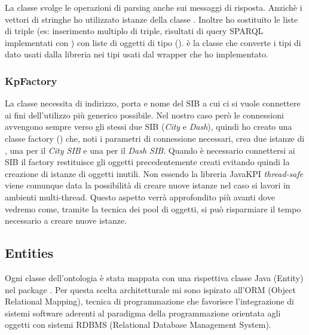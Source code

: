La classe  svolge le operazioni di parsing anche sui messaggi di risposta. Anzichè i vettori di stringhe ho utilizzato istanze della classe . Inoltre ho sostituito le liste di triple (es: inserimento multiplo di triple, risultati di query SPARQL implementati con ) con liste di oggetti di tipo  ().  è la classe che converte i tipi di dato usati dalla libreria  nei tipi usati dal wrapper che ho implementato.

\subsubsection{KpFactory}

La classe  necessita di indirizzo, porta e nome del SIB a cui ci si vuole connettere ai fini dell'utilizzo più generico possibile. Nel nostro caso però le connessioni avvengono sempre verso gli stessi due SIB (\emph{City} e \emph{Dash}), quindi ho creato una classe factory () che, noti i parametri di connessione necessari, crea due istanze di , una per il \emph{City SIB} e una per il \emph{Dash SIB}. Quando è necessario connettersi ai SIB il factory restituisce gli oggetti precedentemente creati evitando quindi la creazione di istanze di oggetti inutili. Non essendo la libreria JavaKPI \emph{thread-safe} viene comunque data la possibilità di creare nuove istanze nel caso si lavori in ambienti multi-thread. Questo aspetto verrà approfondito più avanti dove vedremo come, tramite la tecnica dei pool di oggetti, si può risparmiare il tempo necessario a creare nuove istanze.


\subsection{Entities}

Ogni classe dell'ontologia è stata mappata con una rispettiva classe Java (Entity) nel package . Per questa scelta architetturale mi sono ispirato all'ORM (Object Relational Mapping), tecnica di programmazione che favorisce l'integrazione di sistemi software aderenti al paradigma della programmazione orientata agli oggetti con sistemi RDBMS (Relational Database Management System). %

